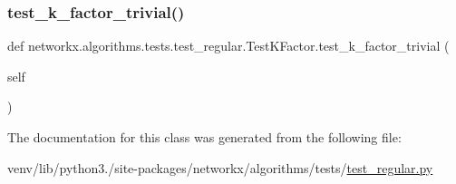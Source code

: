 \subsubsection{\texorpdfstring{test\+\_\+k\+\_\+factor\+\_\+trivial()}{test\_k\_factor\_trivial()}}
{\footnotesize\ttfamily def networkx.\+algorithms.\+tests.\+test\+\_\+regular.\+Test\+K\+Factor.\+test\+\_\+k\+\_\+factor\+\_\+trivial (\begin{DoxyParamCaption}\item[{}]{self }\end{DoxyParamCaption})}



The documentation for this class was generated from the following file\+:\begin{DoxyCompactItemize}
\item 
venv/lib/python3./site-\/packages/networkx/algorithms/tests/\hyperlink{test__regular_8py}{test\+\_\+regular.\+py}\end{DoxyCompactItemize}
